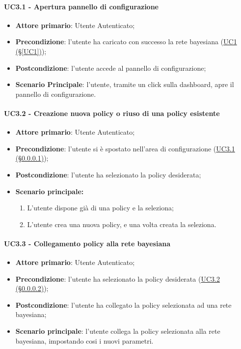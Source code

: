 \paragraph{UC3.1 - Apertura pannello di configurazione}\label{UC3.1}
\begin{itemize}
	\item \textbf{Attore primario}: Utente Autenticato; 
	\item \textbf{Precondizione}: l'utente ha caricato con successo la rete bayesiana (\hyperref[UC1]{UC1 (§\ref*{UC1})});
	\item \textbf{Postcondizione}: l'utente accede al pannello di configurazione;
	\item \textbf{Scenario Principale}: l'utente, tramite un click sulla dashboard, apre il pannello di configurazione. 
\end{itemize}

\paragraph{UC3.2 - Creazione nuova policy o riuso di una policy esistente}\label{UC3.2}

\begin{itemize}
	\item \textbf{Attore primario}: Utente Autenticato; 
	\item \textbf{Precondizione}: l'utente si è spostato nell'area di configurazione (\hyperref[UC3.1]{UC3.1 (§\ref*{UC3.1})});
	\item \textbf{Postcondizione}: l'utente ha selezionato la policy desiderata;
	\item \textbf{Scenario principale:}
	\begin{enumerate}
		\item L'utente dispone già di una policy e la seleziona; 
		\item L'utente crea una nuova policy, e una volta creata la seleziona. 
	\end{enumerate}
	
\end{itemize}

\paragraph{UC3.3 - Collegamento policy alla rete bayesiana}\label{UC3.3}
\begin{itemize}
	\item \textbf{Attore primario}: Utente Autenticato; 
	\item \textbf{Precondizione}: l'utente ha selezionato la policy desiderata (\hyperref[UC3.2]{UC3.2 (§\ref*{UC3.2})});
	\item \textbf{Postcondizione}: l'utente ha collegato la policy selezionata ad una rete bayesiana; 
	\item \textbf{Scenario principale}: l'utente collega la policy selezionata alla rete bayesiana, impostando cosi i nuovi parametri. 
\end{itemize}


